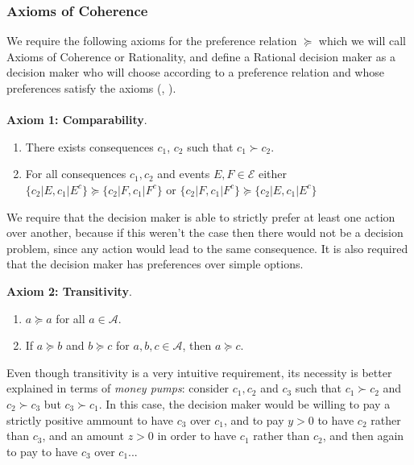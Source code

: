 \documentclass[english,letterpaper,12pt,final]{article}
\theoremstyle{definition}
\begin{document}
	\subsubsection{Axioms of Coherence}
	We require the following axioms for the preference relation $\succeq$ which we will call Axioms of Coherence or Rationality, and define a Rational decision maker as a decision maker who will choose according to a preference relation and whose preferences satisfy the axioms (\cite{bernardo2000bayesian}, \cite{gilboa2009decision}).\\
	\\
	\indent \textbf{Axiom 1: Comparability}.
	\begin{enumerate}[label=(\roman*)]
	\item There exists consequences $c_1$, $c_2$ such that $c_1 \succ c_2$.
	\item For all consequences $c_1, c_2$ and events $E,F \in \mathcal{E}$ either $\{  c_2 | E , c_1 | E^c\} \succeq \{ c_2 | F, c_1 | F^c \}$ or $\{ c_2 | F, c_1 | F^c \} \succeq \{  c_2 | E , c_1 | E^c\}$
	\end{enumerate}
	We require that the decision maker is able to strictly prefer at least one action over another, because if this weren't the case then there would not be a decision problem, since any action would lead to the same consequence. It is also required that the decision maker has preferences over simple options.
	
	\textbf{Axiom 2: Transitivity}.
	\begin{enumerate}[label=(\roman*)]
	\item $a \succeq a$ for all $a \in \mathcal{A}$.
	\item If $a \succeq b$ and $b \succeq c$ for $a,b,c \in \mathcal{A}$, then $a \succeq c$.
	\end{enumerate}
	Even though transitivity is a very intuitive requirement, its necessity is better explained in terms of \textit{money pumps}: consider $c_1, c_2$ and $c_3$ such that $c_1 \succ c_2$ and $c_2 \succ c_3$ but $c_3 \succ c_1$. In this case, the decision maker would be willing to pay a strictly positive ammount to have $c_3$ over $c_1$, and to pay $y>0$ to have $c_2$ rather than $c_3$, and an amount $z>0$ in order to have $c_1$ rather than $c_2$, and then again to pay to have $c_3$ over $c_1$...
	
\end{document}

